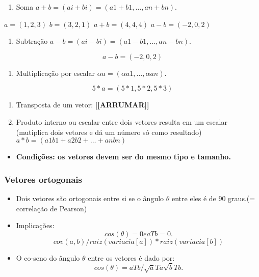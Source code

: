\documentclass[
]{article}
\providecommand{\tightlist}{%
  \setlength{\itemsep}{0pt}\setlength{\parskip}{0pt}}
\begin{document}
\begin{enumerate}
\def\labelenumi{\arabic{enumi}.}
\tightlist
\item
  Soma \(a + b = (ai + b i ) = (a1 + b 1, … , an + b n)\).
\end{enumerate}

\(a = (1, 2, 3)\) \(b = (3, 2, 1)\) \(a+b = (4, 4, 4)\)
\(a-b = (-2, 0, 2)\)

\begin{enumerate}
\def\labelenumi{\arabic{enumi}.}
\setcounter{enumi}{1}
\tightlist
\item
  Subtração \(a - b = (ai - b i ) = (a1 - b 1, … , an - b n)\).
\end{enumerate}

\[
a-b = (-2, 0, 2)
\]

\begin{enumerate}
\def\labelenumi{\arabic{enumi}.}
\setcounter{enumi}{2}
\tightlist
\item
  Multiplicação por escalar \(\alpha a = (\alpha a1, … , \alpha an)\).
\end{enumerate}

\[
5 * a = (5*1, 5*2, 5*3)
\]

\begin{enumerate}
\def\labelenumi{\arabic{enumi}.}
\setcounter{enumi}{3}
\item
  Transposta de um vetor: \textbf{{[}{[}ARRUMAR{]}{]}}
\item
  Produto interno ou escalar entre dois vetores resulta em um escalar
  (mutiplica dois vetores e dá um número só como resultado)
  \(a * b = (a1b 1 + a2b 2 + … + anb n)\)
\end{enumerate}

\begin{itemize}
\tightlist
\item
  \textbf{Condições: os vetores devem ser do mesmo tipo e tamanho.}
\end{itemize}

\hypertarget{vetores-ortogonais}{%
\subsubsection{Vetores ortogonais}\label{vetores-ortogonais}}

\begin{itemize}
\item
  Dois vetores são ortogonais entre si se o ângulo \(\theta\) entre eles
  é de 90 graus.(= correlação de Pearson)
\item
  Implicações: \[cos(\theta) = 0 e aTb = 0.\]
  \[ cov (a,b) / raiz(variacia[a]) * raiz(variacia[b])\]
\item
  O co-seno do ângulo \(\theta\) entre os vetores é dado por:
  \[cos(\theta) = aTb / \sqrt aTa\sqrt bTb .\]
\end{itemize}
\end{document}
